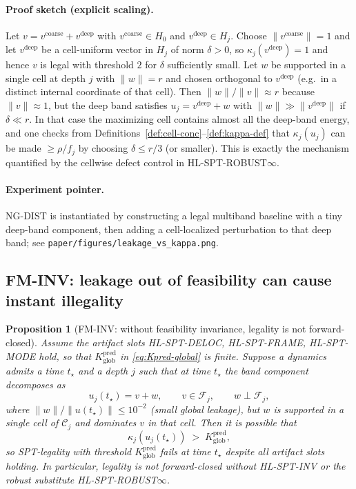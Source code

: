 \documentclass[11pt]{article}
\newtheorem{proposition}[definition]{Proposition}
\begin{document}
\paragraph{Proof sketch (explicit scaling).}
Let $v=v^{\mathrm{coarse}}+v^{\mathrm{deep}}$ with $v^{\mathrm{coarse}}\in H_0$ and $v^{\mathrm{deep}}\in H_j$.
Choose $\|v^{\mathrm{coarse}}\|=1$ and let $v^{\mathrm{deep}}$ be a cell-uniform vector in $H_j$ of norm $\delta>0$, so $\kappa_j(v^{\mathrm{deep}})=1$ and hence $v$ is legal with threshold $2$ for $\delta$ sufficiently small.
Let $w$ be supported in a single cell at depth $j$ with $\|w\|=r$ and chosen orthogonal to $v^{\mathrm{deep}}$ (e.g.\ in a distinct internal coordinate of that cell).
Then $\|w\|/\|v\|\approx r$ because $\|v\|\approx 1$, but the deep band satisfies $u_j=v^{\mathrm{deep}}+w$ with $\|w\|\gg \|v^{\mathrm{deep}}\|$ if $\delta\ll r$.
In that case the maximizing cell contains almost all the deep-band energy, and one checks from Definitions~\ref{def:cell-conc}--\ref{def:kappa-def} that $\kappa_j(u_j)$ can be made $\ge \rho/f_j$ by choosing $\delta \le r/3$ (or smaller).
This is exactly the mechanism quantified by the cellwise defect control in HL-SPT-ROBUST$\infty$.

\paragraph{Experiment pointer.}
NG-DIST is instantiated by constructing a legal multiband baseline with a tiny deep-band component, then adding a cell-localized perturbation to that deep band; see \nolinkurl{paper/figures/leakage_vs_kappa.png}.

\subsection{FM-INV: leakage out of feasibility can cause instant illegality}

\begin{proposition}[FM-INV: without feasibility invariance, legality is not forward-closed]\label{prop:fm-inv}
Assume the artifact slots HL-SPT-DELOC, HL-SPT-FRAME, HL-SPT-MODE hold, so that $K^{\mathrm{pred}}_{\mathrm{glob}}$ in \eqref{eq:Kpred-global} is finite.
Suppose a dynamics admits a time $t_\star$ and a depth $j$ such that at time $t_\star$ the band component decomposes as
\[
u_j(t_\star)=v+w,
\qquad v\in\mathcal{F}_j,
\qquad w\perp \mathcal{F}_j,
\]
where $\|w\|/\|u(t_\star)\|\le 10^{-2}$ (small global leakage), but $w$ is supported in a single cell of $\mathcal{C}_j$ and dominates $v$ in that cell.
Then it is possible that
\[
\kappa_j(u_j(t_\star)) \;>\; K^{\mathrm{pred}}_{\mathrm{glob}},
\]
so SPT-legality with threshold $K^{\mathrm{pred}}_{\mathrm{glob}}$ fails at time $t_\star$ despite all artifact slots holding.
In particular, legality is not forward-closed without HL-SPT-INV or the robust substitute HL-SPT-ROBUST$\infty$.
\end{proposition}
\end{document}
